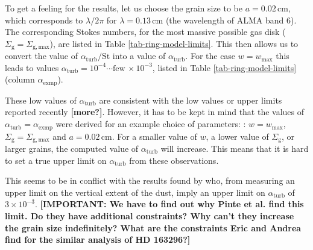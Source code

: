 \documentclass{aa}
\begin{document}
To get a feeling for the results, let us choose the grain size to be
$a=0.02\,\mathrm{cm}$, which corresponds to $\lambda/2\pi$ for
$\lambda=0.13\,\mathrm{cm}$ (the wavelength of ALMA band 6).  The corresponding
Stokes numbers, for the most massive possible gas disk
($\Sigma_{\mathrm{g}}=\Sigma_{\mathrm{g,max}}$), are listed in Table
\ref{tab-ring-model-limits}. This then allows us to convert the value of
$\alpha_{\mathrm{turb}}/\mathrm{St}$ into a value of
$\alpha_{\mathrm{turb}}$. For the case $w=w_{\mathrm{max}}$ this leads to values
$\alpha_{\mathrm{turb}}= 10^{-4}\cdots\mathrm{few}\,\times 10^{-3}$, listed in
Table \ref{tab-ring-model-limits} (column $\alpha_{\mathrm{exmp}}$).

These low values of $\alpha_{\mathrm{turb}}$ are consistent with the low values
or upper limits reported recently \citep{2016ApJ...816...25P,
  2018ApJ...856..117F} {\bf [more?]}. However, it has to be kept in mind that
the values of $\alpha_{\mathrm{turb}}=\alpha_{\mathrm{exmp}}$ were derived for
an example choice of parameters: : $w=w_{\mathrm{max}}$,
$\Sigma_{\mathrm{g}}=\Sigma_{\mathrm{g,max}}$ and $a=0.02\,\mathrm{cm}$. For a
smaller value of $w$, a lower value of $\Sigma_{\mathrm{g}}$, or larger grains,
the computed value of $\alpha_{\mathrm{turb}}$ will increase. This means that it
is hard to set a true upper limit on $\alpha_{\mathrm{turb}}$ from these
observations.

This seems to be in conflict with the results found by
\citet{2016ApJ...816...25P} who, from measuring an upper limit on the vertical
extent of the dust, imply an upper limit on $\alpha_{\mathrm{turb}}$ of $3\times
10^{-3}$. {\bf [IMPORTANT: We have to find out why Pinte et al. find this
    limit. Do they have additional constraints? Why can't they increase the grain
    size indefinitely? What are the constraints Eric and Andrea find for the
similar analysis of HD 163296?]}
\end{document}
